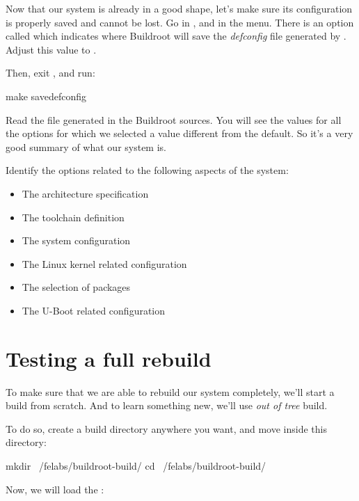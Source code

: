 Now that our system is already in a good shape, let's make sure its
configuration is properly saved and cannot be lost. Go in
, and in the  menu. There is an
option called  which indicates
where Buildroot will save the {\em defconfig} file generated by
. Adjust this value to
.

Then, exit , and run:

\begin{bashinput}
make savedefconfig
\end{bashinput}

Read the file  generated in the
Buildroot sources. You will see the values for all the options for
which we selected a value different from the default. So it's a very
good summary of what our system is.

Identify the options related to the following aspects of the system:

\begin{itemize}
\item The architecture specification
\item The toolchain definition
\item The system configuration
\item The Linux kernel related configuration
\item The selection of packages
\item The U-Boot related configuration
\end{itemize}

\section{Testing a full rebuild}

To make sure that we are able to rebuild our system completely, we'll
start a build from scratch. And to learn something new, we'll use {\em
  out of tree} build.

To do so, create a build directory anywhere you want, and move inside
this directory:

\begin{bashinput}
mkdir ~/felabs/buildroot-build/
cd ~/felabs/buildroot-build/
\end{bashinput}

Now, we will load the :


